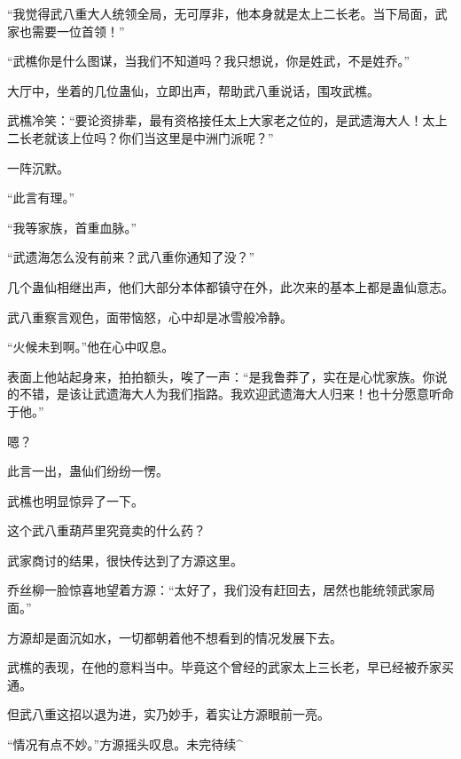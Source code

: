 \begin{this_body}
“我觉得武八重大人统领全局，无可厚非，他本身就是太上二长老。当下局面，武家也需要一位首领！”

“武樵你是什么图谋，当我们不知道吗？我只想说，你是姓武，不是姓乔。”

大厅中，坐着的几位蛊仙，立即出声，帮助武八重说话，围攻武樵。

武樵冷笑：“要论资排辈，最有资格接任太上大家老之位的，是武遗海大人！太上二长老就该上位吗？你们当这里是中洲门派呢？”

一阵沉默。

“此言有理。”

“我等家族，首重血脉。”

“武遗海怎么没有前来？武八重你通知了没？”

几个蛊仙相继出声，他们大部分本体都镇守在外，此次来的基本上都是蛊仙意志。

武八重察言观色，面带恼怒，心中却是冰雪般冷静。

“火候未到啊。”他在心中叹息。

表面上他站起身来，拍拍额头，唉了一声：“是我鲁莽了，实在是心忧家族。你说的不错，是该让武遗海大人为我们指路。我欢迎武遗海大人归来！也十分愿意听命于他。”

嗯？

此言一出，蛊仙们纷纷一愣。

武樵也明显惊异了一下。

这个武八重葫芦里究竟卖的什么药？

武家商讨的结果，很快传达到了方源这里。

乔丝柳一脸惊喜地望着方源：“太好了，我们没有赶回去，居然也能统领武家局面。”

方源却是面沉如水，一切都朝着他不想看到的情况发展下去。

武樵的表现，在他的意料当中。毕竟这个曾经的武家太上三长老，早已经被乔家买通。

但武八重这招以退为进，实乃妙手，着实让方源眼前一亮。

“情况有点不妙。”方源摇头叹息。未完待续\^{}

\end{this_body}

